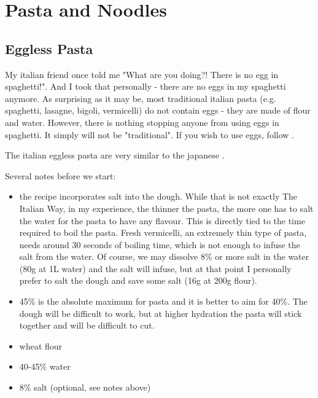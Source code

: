 \chapter{Pasta and Noodles}
\section{Eggless Pasta} \label{eggless-pasta}
My italian friend once told me "What are you doing?! There is no egg in
spaghetti!". And I took that personally - there are no eggs in my spaghetti
anymore. As surprising as it may be, most traditional italian pasta (e.g. spaghetti,
lasagne, bigoli, vermicelli) do not contain eggs - they are made of flour and
water. However, there is nothing stopping anyone from using eggs in spaghetti.
It simply will not be "traditional". If you wish to use eggs, follow
.

The italian eggless pasta are very similar to the japanese .

\label{eggless-pasta-notes} Several notes before we start:
\begin{itemize}
  \item the recipe incorporates salt into the dough. While that is not exactly
    The Italian Way, in my experience, the thinner the pasta, the more one has
    to salt the water for the pasta to have any flavour. This is directly tied
    to the time required to boil the pasta. Fresh vermicelli, an extremely thin
    type of pasta, needs around 30 seconds of boiling time, which is not enough
    to infuse the salt from the water. Of course, we may dissolve 8\% or more
    salt in the water (80g at 1L water) and the salt will infuse, but at that
    point I personally prefer to salt the dough and save some salt (16g at 200g
    flour).
  \item 45\% is the absolute maximum for pasta and it is better to aim for
    40\%. The dough will be difficult to work, but at higher hydration the
    pasta will stick together and will be difficult to cut.
\end{itemize}

\begin{itemize}
  \item wheat flour
  \item 40-45\% water
  \item 8\% salt (optional, see notes above)
\end{itemize}

